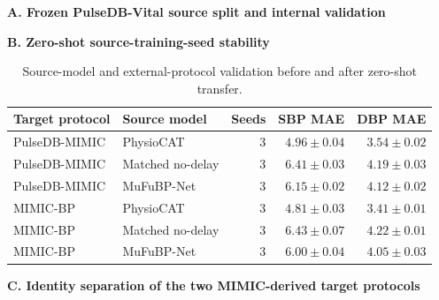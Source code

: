 \documentclass[11pt]{article}
\begin{document}
\begin{table}[H]
\centering
\caption{Source-model and external-protocol validation before and after zero-shot transfer.}
\label{tab:source_seed_stability}
\label{tab:mimic_identity}
\label{tab:source_model_validation}
\scriptsize
\textbf{A. Frozen PulseDB-Vital source split and internal validation}\\[0.25em]

\vspace{0.45em}
\textbf{B. Zero-shot source-training-seed stability}\\[0.25em]
\begin{tabular}{llrrr}
\toprule
Target protocol & Source model & Seeds & SBP MAE & DBP MAE \\
\midrule
PulseDB-MIMIC & PhysioCAT & 3 & $4.96 \pm 0.04$ & $3.54 \pm 0.02$ \\
PulseDB-MIMIC & Matched no-delay & 3 & $6.41 \pm 0.03$ & $4.19 \pm 0.03$ \\
PulseDB-MIMIC & MuFuBP-Net & 3 & $6.15 \pm 0.02$ & $4.12 \pm 0.02$ \\
MIMIC-BP & PhysioCAT & 3 & $4.81 \pm 0.03$ & $3.41 \pm 0.01$ \\
MIMIC-BP & Matched no-delay & 3 & $6.43 \pm 0.07$ & $4.22 \pm 0.01$ \\
MIMIC-BP & MuFuBP-Net & 3 & $6.00 \pm 0.04$ & $4.05 \pm 0.03$ \\
\bottomrule
\end{tabular}

\vspace{0.45em}
\textbf{C. Identity separation of the two MIMIC-derived target protocols}\\[0.25em]
\end{table}
\end{document}
